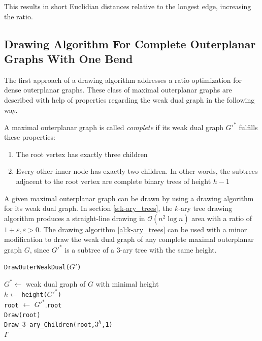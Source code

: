 This results in short Euclidian distances relative to the longest edge, increasing the ratio.\\

\subsection{Drawing Algorithm For Complete Outerplanar Graphs With One Bend}
The first approach of a drawing algorithm addresses a ratio optimization for dense outerplanar graphs. These class of maximal outerplanar graphs are described with help of properties regarding the weak dual graph in the following way.
\begin{definition}\label{def:complete_maximal_outerplanar}
	A maximal outerplanar graph is called \emph{complete} if its weak dual graph $G'^*$ fulfills these properties:
	\begin{enumerate}
		\item The root vertex has exactly three children
		\item Every other inner node has exactly two children. In other words, the subtrees adjacent to the root vertex are complete binary trees of height $h-1$
	\end{enumerate}
\end{definition}
A given maximal outerplanar graph can be drawn by using a drawing algorithm for its weak dual graph. In section \ref{s:k-ary_trees}, the $k$-ary tree drawing algorithm produces a straight-line drawing in $\mathcal{O}(n^2 \log n)$ area with a ratio of $1+\varepsilon,\varepsilon>0$. The drawing algorithm \ref{al:k-ary_trees} can be used with a minor modification to draw the weak dual graph of any complete maximal outerplanar graph $G$, since $G'^*$ is a subtree of a $3$-ary tree with the same height.\\

\begin{algorithm}[H]
	\caption{\texttt{DrawOuterWeakDual($G'$)}}\label{al:drawouterweakdual}
	$G^* \gets$ weak dual graph of $G$ with minimal height\\
	$h \gets$ \texttt{height($G'^*$)}\\
	\texttt{root} $\gets$ $G'^*$.\texttt{root}\\
	\texttt{Draw(root)}\\
	\texttt{Draw\_$3$-ary\_Children(\texttt{root},$3^h$,1)}\\
	\Return $\Gamma$
\end{algorithm}

